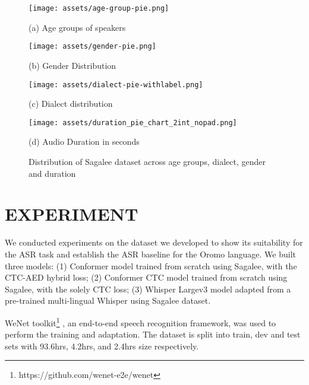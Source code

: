\documentclass[conference, 9pt]{IEEEtran}
\begin{document}
\begin{figure}[htb]
\begin{minipage}[b]{.48\linewidth}
  \centering
  \centerline{\texttt{[image: assets/age-group-pie.png]}}
  \centerline{(a) Age groups of speakers}\medskip
\end{minipage}
\hfill
\begin{minipage}[b]{0.48\linewidth}
  \centering
  \centerline{\texttt{[image: assets/gender-pie.png]}}
  \centerline{(b) Gender Distribution}\medskip
\end{minipage}
%

\begin{minipage}[b]{.48\linewidth}
  \centering
  \centerline{\texttt{[image: assets/dialect-pie-withlabel.png]}}
  \centerline{(c) Dialect distribution}\medskip
\end{minipage}
\hfill
\begin{minipage}[b]{0.48\linewidth}
  \centering
  \centerline{\texttt{[image: assets/duration\_pie\_chart\_2int\_nopad.png]}}
  \centerline{(d) Audio Duration in seconds }\medskip
\end{minipage}

\caption{Distribution of Sagalee dataset across age groups, dialect, gender and duration}
\label{fig:stats}
%
\end{figure}

\section{EXPERIMENT}
\label{sec:typestyle}
We conducted experiments on the dataset we developed to show its suitability for the ASR task and establish the ASR baseline for the Oromo language. We built three models: (1) Conformer model trained from scratch using Sagalee, with the CTC-AED hybrid loss; (2) Conformer CTC model trained from scratch using Sagalee, with the solely CTC loss; (3) Whisper Largev3 model adapted from a pre-trained multi-lingual Whisper using Sagalee dataset. 

WeNet toolkit\footnote{https://github.com/wenet-e2e/wenet} \cite{yao2021wenet}, an end-to-end speech recognition framework, was used to perform the training and adaptation. The dataset is split into train, dev and test sets with 93.6hrs, 4.2hrs, and 2.4hrs size respectively. 
\end{document}
